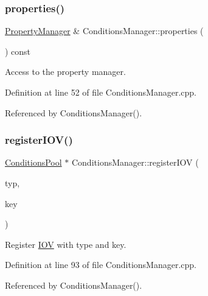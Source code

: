 \subsubsection{\texorpdfstring{properties()}{properties()}}
{\footnotesize\ttfamily \hyperlink{class_d_d4hep_1_1_property_manager}{Property\+Manager} \& Conditions\+Manager\+::properties (\begin{DoxyParamCaption}{ }\end{DoxyParamCaption}) const}



Access to the property manager. 



Definition at line 52 of file Conditions\+Manager.\+cpp.



Referenced by Conditions\+Manager().

\hypertarget{class_d_d4hep_1_1_conditions_1_1_conditions_manager_a5be8e5c4facef3b9658b6e270c37c1b7}{}\label{class_d_d4hep_1_1_conditions_1_1_conditions_manager_a5be8e5c4facef3b9658b6e270c37c1b7} 
\subsubsection{\texorpdfstring{register\+I\+O\+V()}{registerIOV()}}
{\footnotesize\ttfamily \hyperlink{class_d_d4hep_1_1_conditions_1_1_conditions_pool}{Conditions\+Pool} $\ast$ Conditions\+Manager\+::register\+I\+OV (\begin{DoxyParamCaption}\item[{const \hyperlink{class_d_d4hep_1_1_i_o_v_type}{I\+O\+V\+Type} \&}]{typ,  }\item[{\hyperlink{class_d_d4hep_1_1_i_o_v_a07cb46dc875296dc9cccf4ff370104ae}{I\+O\+V\+::\+Key}}]{key }\end{DoxyParamCaption})}



Register \hyperlink{class_d_d4hep_1_1_i_o_v}{I\+OV} with type and key. 



Definition at line 93 of file Conditions\+Manager.\+cpp.



Referenced by Conditions\+Manager().

